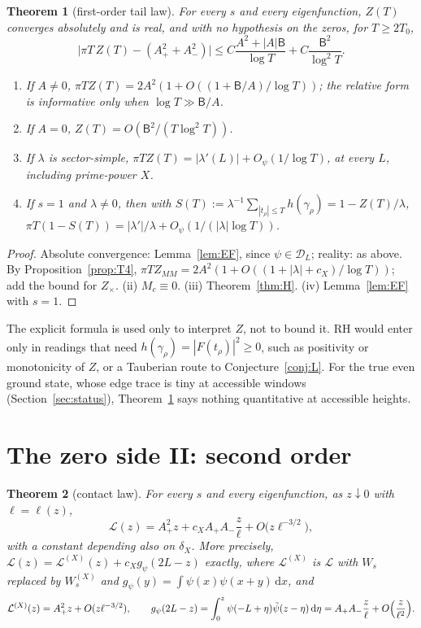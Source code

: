 \documentclass[11pt]{amsart}
\newcommand{\cL}{\mathcal{L}}
\newcommand{\dd}{\,\mathrm{d}}
\newtheorem{theorem}{Theorem}[section]
\theoremstyle{definition}
\theoremstyle{remark}
\numberwithin{equation}{section}
\begin{document}
\begin{theorem}[first-order tail law]\label{thm:T2}
For every $s$ and every eigenfunction, $Z(T)$ converges absolutely and is real, and with no hypothesis on the zeros, for $T\ge2T_0$,
\[
\bigl|\pi T\,Z(T)-(A_+^2+A_-^2)\bigr|\le C\frac{A^2+|A|\mathsf B}{\log T}+C\frac{\mathsf B^2}{\log^2T}.
\]
\begin{enumerate}
\item[(i)] If $A\ne0$, $\pi TZ(T)=2A^2(1+O((1+\mathsf B/A)/\log T))$; the relative form is informative only when $\log T\gg\mathsf B/A$.
\item[(ii)] If $A=0$, $Z(T)=O(\mathsf B^2/(T\log^2T))$.
\item[(iii)] If $\lambda$ is sector-simple, $\pi TZ(T)=|\lambda'(L)|+O_\psi(1/\log T)$, at every $L$, including prime-power $X$.
\item[(iv)] If $s=1$ and $\lambda\ne0$, then with $S(T):=\lambda^{-1}\sum_{|t_\rho|\le T}h(\gamma_\rho)=1-Z(T)/\lambda$, $\pi T(1-S(T))=|\lambda'|/\lambda+O_\psi(1/(|\lambda|\log T))$.
\end{enumerate}
\end{theorem}

\begin{proof}
Absolute convergence: Lemma~\ref{lem:EF}, since $\psi\in \mathcal D_L$; reality: as above. By Proposition~\ref{prop:T4}, $\pi TZ_{MM}=2A^2(1+O((1+|\lambda|+c_X)/\log T))$; add the bound for $Z_\times$. (ii) $M_c\equiv0$. (iii) Theorem~\ref{thm:H}. (iv) Lemma~\ref{lem:EF} with $s=1$.
\end{proof}

The explicit formula is used only to interpret $Z$, not to bound it. RH would enter only in readings that need $h(\gamma_\rho)=|F(t_\rho)|^2\ge0$, such as positivity or monotonicity of $Z$, or a Tauberian route to Conjecture~\ref{conj:L}. For the true even ground state, whose edge trace is tiny at accessible windows (Section~\ref{sec:status}), Theorem~\ref{thm:T2} says nothing quantitative at accessible heights.

\section{The zero side II: second order}\label{sec:zero2}

\begin{theorem}[contact law]\label{thm:contact}
For every $s$ and every eigenfunction, as $z\downarrow0$ with $\ell=\ell(z)$,
\[
\cL(z)=A_+^2z+c_XA_+A_-\frac z{\ell}+O\bigl(z\ell^{-3/2}\bigr),
\]
with a constant depending also on $\delta_X$. More precisely, $\cL(z)=\cL^{(X)}(z)+c_Xg_\psi(2L-z)$ exactly, where $\cL^{(X)}$ is $\cL$ with $W_s$ replaced by $W^{(X)}_s$ and $g_\psi(y)=\int\psi(x)\psi(x+y)\dd x$, and
\[
\cL^{(X)}(z)=A_+^2z+O(z\ell^{-3/2}),\qquad g_\psi(2L-z)=\int_0^z\psi(-L+\eta)\tilde\psi(z-\eta)\dd\eta=A_+A_-\frac z\ell+O\Bigl(\frac z{\ell^2}\Bigr).
\]
\end{theorem}
\end{document}
